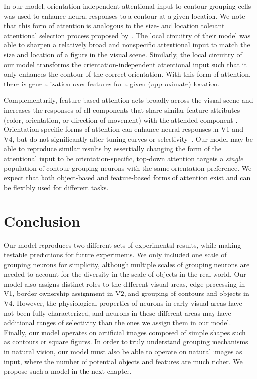 In our model, orientation-independent attentional input to contour
grouping cells was used to enhance neural responses to a contour at a
given location.  We note that this form of attention is analogous to
the size- and location tolerant attentional selection process proposed
by~\cite{Mihalas_etal11b}. The local circuitry of their model was able
to sharpen a relatively broad and nonspecific attentional input to
match the size and location of a figure in the visual
scene. Similarly, the local circuitry of our model transforms the
orientation-independent attentional input such that it only enhances
the contour of the correct orientation. With this form of attention,
there is generalization over features for a given (approximate)
location.

Complementarily, feature-based attention acts broadly across the
visual scene and increases the responses of all components that share
similar feature attributes (\eg color, orientation, or direction of
movement) with the attended
component \citep{Motter94a,Treue_Trujillo99}.
Orientation-specific forms of attention
can enhance neural
responses in V1 and V4, but do not significantly alter
tuning curves or selectivity~\citep{McAdams_Maunsell99a}. 
Our model may be able to reproduce similar results by essentially changing the
form of the attentional input to be orientation-specific, \ie top-down
attention targets a \emph{single} population of contour grouping
neurons with the same orientation preference.
We expect that both
object-based and feature-based forms of attention exist and can be
flexibly used for different tasks.

\section{Conclusion}

Our model reproduces two different sets of experimental
results, while making testable predictions for future experiments. 
We only included one scale of grouping neurons for
simplicity, although 
multiple scales of grouping
neurons are needed to account for the diversity in the scale of
objects in the real world.
Our model also assigns distinct roles to the
different visual areas,  edge processing in V1, border ownership
assignment in V2, and grouping of contours and objects in V4. However,
the physiological properties of neurons in early visual areas have not
been fully characterized, and 
neurons in these different
areas may have 
additional ranges of selectivity
than the ones we assign them in our model. 
Finally, our model operates on artificial
images composed of simple shapes such as contours or square
figures. In order to truly understand grouping mechanisms in natural
vision, our model must also be able to operate on natural images as
input, where the number of potential objects and features are much
richer. We propose such a model in the next chapter.

